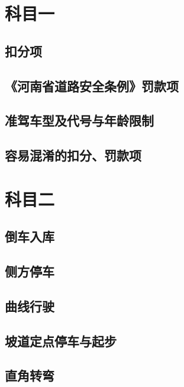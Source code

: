\documentclass[b5paper]{ctexbook}
\title{\docname}
\author{\companyname}
\date{\today}
\begin{document}
    \maketitle

    \tableofcontents
    \fangsong
    \chapter{科目一}
    \section{扣分项}
    

    \section{《河南省道路安全条例》罚款项}
    

    \section{准驾车型及代号与年龄限制}
    

    \section{容易混淆的扣分、罚款项}
    

    \chapter{科目二}

    \section{倒车入库}
    

    \section{侧方停车}
    

    \section{曲线行驶}
    

    \section{坡道定点停车与起步}
    

    \section{直角转弯}
    
\end{document}

